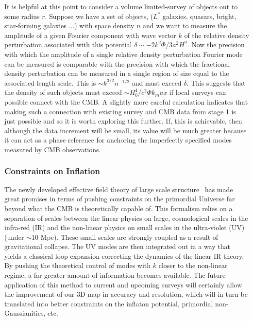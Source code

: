 \documentclass[psfig,11pt]{article}
\begin{document}
It is helpful at this point to consider a volume limited-survey of objects out to some radius $r$. Suppose we have a set of objects, ($L^\ast$ galaxies, quasars, bright, star-forming galaxies $\dots$) with space density $n$ and we want to measure the amplitude of a given Fourier component with wave vector $k$ of the relative density perturbation associated with this potential $\delta\sim-2k^2\Phi/3a^2H^2$. Now the precision with which the amplitude of a single relative density perturbation Fourier mode can be measured is comparable with the precision with which the fractional density perturbation can be measured in a single region of size equal to the associated length scale. This is $\sim k^{3/2}n^{-1/2}$ and must exceed $\delta$. This suggests that the density of such objects must exceed $\sim H_0^4/c^2\Phi k_max$ if local surveys can possible connect with the CMB. A slightly more careful calculation indicates that making such a connection with existing survey and CMB data from stage 1 is just possible and so it is worth exploring this further. If, this is achievable, then although the data increment will be small, its value will be much greater because it can act as a phase reference for anchoring the imperfectly specified modes measured by CMB observations.

\subsubsection{Constraints on Inflation}

The newly developed effective field theory of large scale structure~\cite{Carrasco2012} has made great promises in terms of pushing constraints on the primordial Universe far beyond what the CMB is theoretically capable of. This formalism relies on a separation of scales between the linear physics on large, cosmological scales in the infra-red (IR) and the non-linear physics on small scales in the ultra-violet (UV) (under $\sim10$ Mpc). These small scales are strongly coupled as a result of gravitational collapse. The UV modes are then integrated out in a way that yields a classical loop expansion correcting the dynamics of the linear IR theory. By pushing the theoretical control of modes with $k$ closer to the non-linear regime, a far greater amount of information becomes available. The future application of this method to current and upcoming surveys will certainly allow the improvement of our 3D map in accuracy and resolution, which will in turn be translated into better constraints on the inflaton potential, primordial non-Gaussianities, etc.
\end{document}
